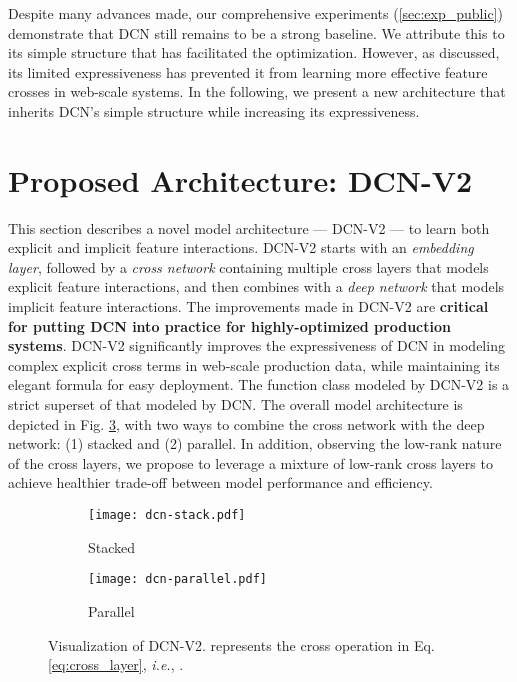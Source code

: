 \documentclass[sigconf]{acmart}
\begin{document}
Despite many advances made, our comprehensive experiments (\autoref{sec:exp_public}) demonstrate that DCN still remains to be a strong baseline. We attribute this to its simple structure that has facilitated the optimization. However, as discussed, its limited expressiveness has prevented it from learning more effective feature crosses in web-scale systems. In the following, we present a new architecture that inherits DCN's simple structure while increasing its expressiveness.






\section{Proposed Architecture: {DCN-V2}}
\label{sec:dcn-m}

This section describes a novel model architecture --- {DCN-V2} --- to learn both explicit and implicit feature interactions. {DCN-V2} starts with an \emph{embedding layer}, followed by a \emph{cross network} containing multiple cross layers that models explicit feature interactions, and then combines with a \emph{deep network} that models implicit feature interactions. The improvements made in {DCN-V2} are {\bf critical for putting {DCN} into practice for highly-optimized production systems}. {DCN-V2} significantly improves the expressiveness of DCN \cite{wang2017deep} in modeling complex explicit cross terms in web-scale production data, while maintaining its elegant formula for easy deployment. The function class modeled by {DCN-V2} is a strict superset of that modeled by DCN. The overall model architecture is depicted in Fig. \ref{fig:dcn-visualization}, with two ways to combine the cross network with the deep network: (1) stacked and (2) parallel.  In addition, observing the low-rank nature of the cross layers, we propose to leverage a mixture of low-rank cross layers to achieve healthier trade-off between model performance and efficiency.

\begin{figure}[htbp]
\centering
    \begin{subfigure}[b]{0.2\textwidth}  
    \texttt{[image: dcn-stack.pdf]}
    \caption{Stacked}
    \label{fig:dcn-stack}
    \end{subfigure}
    \hfill
    \begin{subfigure}[b]{0.27\textwidth}  
    \texttt{[image: dcn-parallel.pdf]}
    \caption{Parallel}
    \label{fig:dcn-parallel}
    \end{subfigure}
    \caption{Visualization of {DCN-V2}.  represents the cross operation in Eq. \eqref{eq:cross_layer}, \emph{i.e.}, .}
    \label{fig:dcn-visualization}
\end{figure}
\end{document}
